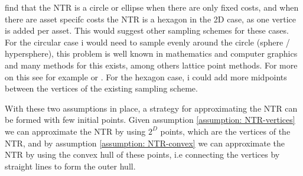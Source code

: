\documentclass[11pt]{article}
\begin{document}
\autocite{Dybvig2020} find that the \ac{NTR} is a circle or ellipse when there are only fixed costs, and when there are asset specifc costs the \ac{NTR} is a hexagon in the 2D case, as one vertice is added per asset.
This would suggest other sampling schemes for these cases. For the circular case i would need to sample evenly around the circle (sphere / hypersphere), this problem is well known in mathematics and computer graphics and many methods for this exists,
among others lattice point methods. For more on this see for example \autocite{UNSWsphere} or \autocite{delbono2024}.
For the hexagon case, i could add more midpoints between the vertices of the existing sampling scheme. 

With these two assumptions in place, a strategy for approximating the \ac{NTR} can be formed with few initial points.
Given assumption \ref{assumption: NTR-vertices} we can approximate the \ac{NTR} by using $2^{D}$ points, which are the vertices of the \ac{NTR},
and by assumption \ref{assumption: NTR-convex} we can approximate the \ac{NTR} by using the convex hull of these points, i.e connecting the vertices by straight lines to form the outer hull.
\end{document}
